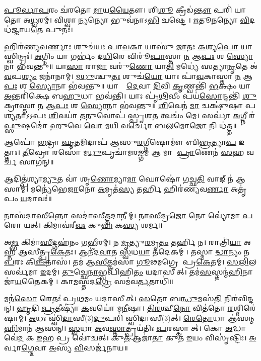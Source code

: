 \ul{𑌪𑍂}\ul{𑌰𑍍𑌵𑌾}\ul{𑌪}𑌰𑌂 𑌚॑𑌰𑌤𑍋 \ul{𑌮𑌾}𑌯\ul{𑌯𑍈}𑌤𑍗।
𑌶𑌿\ul{𑌶𑍂} 𑌕𑍍𑌰𑍀𑌡॑\ul{𑌨𑍍𑌤𑍗} 𑌪𑌰𑌿॑ 𑌯𑌾𑌤𑍋 𑌅\ul{𑌧𑍍𑌵}𑌰𑌮𑍍।
𑌵𑌿𑌶𑍍𑌵𑌾\ul{𑌨𑍍𑌯}𑌨𑍍𑌯𑍋 𑌭𑍁𑌵॑𑌨𑌾𑌽\ul{𑌭𑌿} 𑌚𑌷𑍍𑌟𑍇।
\ul{𑌋}𑌤𑍂\ul{𑌨}𑌨𑍍𑌯𑍋 \ul{𑌵𑌿}𑌦𑌧॑𑌜𑍍𑌜𑌾𑌯\ul{𑌤𑍇} 𑌪𑍁𑌨𑌃॑।

𑌹𑌿𑌰॑𑌣𑍍𑌯𑌵\ul{𑌰𑍍𑌣𑌾𑌃} 𑌶𑍁𑌚॑𑌯𑌃 𑌪𑌾\ul{𑌵}𑌕𑌾 𑌯𑌾𑌸𑍁॑ \ul{𑌜𑌾}𑌤𑌃 \ul{𑌕}𑌶𑍍𑌯\ul{𑌪𑍋} 𑌯𑌾𑌸𑍍𑌵𑌿𑌨𑍍𑌦𑍍𑌰𑌃॑।
\ul{𑌅}𑌗𑍍𑌨𑌿𑌂 𑌯𑌾 𑌗𑌰𑍍𑌭𑌂॑ 𑌦\ul{𑌧𑌿}𑌰𑍇 𑌵𑌿𑌰𑍂॑\ul{𑌪𑌾}𑌸𑍍𑌤𑌾 \ul{𑌨} 𑌆\ul{𑌪𑌃} 𑌶 \ul{𑌸𑍍𑌯𑍋}𑌨𑌾 𑌭॑𑌵𑌨𑍍𑌤𑍁॥ 
𑌯𑌾\ul{𑌸𑌾}\ul{} 𑌰𑌾\ul{𑌜𑌾} 𑌵𑌰𑍁॑\ul{𑌣𑍋} 𑌯𑌾\ul{𑌤𑌿} 𑌮𑌧𑍍𑌯𑍇॑ 𑌸𑌤𑍍𑌯𑌾\ul{𑌨𑍃}𑌤𑍇 𑌅॑\ul{𑌵}𑌪\ul{𑌶𑍍𑌯𑌂} 𑌜𑌨𑌾॑𑌨𑌾𑌮𑍍।
\ul{𑌮}\ul{𑌧𑍁}𑌶𑍍𑌚𑍁\ul{𑌤𑌃} 𑌶𑍁𑌚॑\ul{𑌯𑍋} 𑌯𑌾𑌃 𑌪𑌾॑\ul{𑌵}𑌕𑌾𑌸𑍍𑌤𑌾 \ul{𑌨} 𑌆\ul{𑌪𑌃} 𑌶 \ul{𑌸𑍍𑌯𑍋}𑌨𑌾 𑌭॑𑌵𑌨𑍍𑌤𑍁॥ 
𑌯𑌾𑌸𑌾𑌂᳚ \ul{𑌦𑍇}𑌵𑌾 \ul{𑌦𑌿}𑌵𑌿 \ul{𑌕𑍃}𑌣𑍍𑌵𑌨𑍍𑌤𑌿॑ \ul{𑌭}𑌕𑍍𑌷𑌂 𑌯𑌾 \ul{𑌅}𑌨𑍍𑌤𑌰𑌿॑𑌕𑍍𑌷𑍇 𑌬\ul{𑌹𑍁}𑌧𑌾 𑌭𑌵॑𑌨𑍍𑌤𑌿।
𑌯𑌾𑌃 𑌪𑍃॑\ul{𑌥𑌿}𑌵𑍀𑌂 𑌪𑌯॑\ul{𑌸𑍋}𑌨𑍍𑌦𑌨𑍍𑌤𑌿॑ \ul{𑌶𑍁}𑌕𑍍𑌰𑌾𑌸𑍍𑌤𑌾 \ul{𑌨} 𑌆\ul{𑌪𑌃} 𑌶 \ul{𑌸𑍍𑌯𑍋}𑌨𑌾 𑌭॑𑌵𑌨𑍍𑌤𑍁॥ 
\ul{𑌶𑌿}𑌵𑍇𑌨॑ \ul{𑌮𑌾} 𑌚𑌕𑍍𑌷𑍁॑𑌷𑌾 𑌪𑌶𑍍𑌯𑌤𑌾𑌽𑌽𑌪𑌃 \ul{𑌶𑌿}𑌵𑌯𑌾॑ \ul{𑌤}𑌨𑍁𑌵𑍋𑌪॑ 𑌸𑍍𑌪𑍃𑌶\ul{𑌤} 𑌤𑍍𑌵𑌚𑌂॑ 𑌮𑍇।
𑌸𑌰𑍍𑌵𑌾॑ \ul{𑌅}𑌗𑍍𑌨𑍀 𑌰॑\ul{𑌫𑍍𑌸𑍁}𑌷𑌦𑍋॑ 𑌹𑍁𑌵𑍇 \ul{𑌵𑍋} 𑌮\ul{𑌯𑌿} 𑌵\ul{𑌰𑍍𑌚𑍋} 𑌬\ul{𑌲}𑌮𑍋\ul{𑌜𑍋} 𑌨𑌿 𑌧॑𑌤𑍍𑌤॥

𑌆𑌪𑍋॑ \ul{𑌭}𑌦𑍍𑌰𑌾 \ul{𑌘𑍃}𑌤𑌮𑌿𑌦𑌾𑌪॑ 𑌆𑌸𑍁\ul{𑌰}𑌗𑍍𑌨𑍀𑌷𑍋𑌮𑍗॑ 𑌬𑌿\ul{𑌭𑍍𑌰}𑌤𑍍𑌯𑌾\ul{𑌪} 𑌇𑌤𑍍𑌤𑌾𑌃।
\ul{𑌤𑍀}𑌵𑍍𑌰𑍋 𑌰𑌸𑍋॑ 𑌮\ul{𑌧𑍁}𑌪𑍃𑌚𑌾॑𑌮𑌰\ul{𑌙𑍍𑌗}𑌮 𑌆 𑌮𑌾 \ul{𑌪𑍍𑌰𑌾}𑌣𑍇𑌨॑ \ul{𑌸}𑌹 𑌵𑌰𑍍𑌚॑ 𑌸𑌾𑌗𑌨𑍍॥

𑌆𑌦𑌿𑌤𑍍𑌪॑𑌶𑍍𑌯𑌾\ul{𑌮𑍍𑌯𑍁}𑌤 𑌵𑌾॑ 𑌶𑍃\ul{𑌣𑍋}𑌮𑍍𑌯𑌾\ul{𑌮𑌾} 𑌘𑍋𑌷𑍋॑ 𑌗𑌚𑍍𑌛\ul{𑌤𑌿} 𑌵𑌾𑌙𑍍 𑌨॑ 𑌆𑌸𑌾𑌮𑍍।
𑌮𑌨𑍍𑌯𑍇॑𑌭𑍇\ul{𑌜𑌾}𑌨𑍋 \ul{𑌅}𑌮𑍃𑌤॑\ul{𑌸𑍍𑌯} 𑌤𑌰𑍍\mbox{}\ul{𑌹𑌿} 𑌹𑌿𑌰॑𑌣𑍍𑌯𑌵\ul{𑌰𑍍𑌣𑌾} 𑌅𑌤𑍃॑𑌪𑌂 \ul{𑌯}𑌦𑌾𑌵𑌃॑॥


𑌨𑌾𑌸॑𑌦𑌾\ul{𑌸𑍀}𑌨𑍍𑌨𑍋 𑌸𑌦𑌾॑𑌸𑍀\ul{𑌤𑍍𑌤}𑌦𑌾𑌨𑍀𑌮𑍍।
𑌨𑌾\ul{𑌸𑍀}𑌦𑍍𑌰\ul{𑌜𑍋} 𑌨𑍋 𑌵𑍍𑌯𑍋॑𑌮𑌾 \ul{𑌪}𑌰𑍋 𑌯𑌤𑍍।
𑌕𑌿𑌮𑌾𑌵॑𑌰𑍀\ul{𑌵𑌃} 𑌕𑍁\ul{𑌹} 𑌕\ul{𑌸𑍍𑌯} 𑌶𑌰𑍍𑌮\sn{}॥

𑌅\ul{𑌮𑍍𑌭𑌃} 𑌕𑌿𑌮𑌾॑\ul{𑌸𑍀}𑌦𑍍𑌗𑌹॑𑌨𑌂 𑌗\ul{𑌭𑍀}𑌰𑌮𑍍।
𑌨 \ul{𑌮𑍃}𑌤𑍍𑌯𑍁\ul{𑌰}𑌮𑍃\ul{𑌤𑌂} 𑌤𑌰𑍍\mbox{}\ul{𑌹𑌿} 𑌨।
𑌰𑌾𑌤𑍍𑌰𑌿॑\ul{𑌯𑌾} 𑌅𑌹𑍍𑌨॑ 𑌆𑌸𑍀𑌤𑍍𑌪𑍍𑌰\ul{𑌕𑍇}𑌤𑌃।
𑌆𑌨𑍀॑𑌦\ul{𑌵𑌾}𑌤 \ul{𑌸𑍍𑌵}𑌧\ul{𑌯𑌾} 𑌤𑌦𑍇𑌕𑌮𑍍।
𑌤𑌸𑍍𑌮𑌾\ul{𑌦𑍍𑌧𑌾}𑌨𑍍𑌯𑌂 𑌨 \ul{𑌪}𑌰𑌃 𑌕𑌿\ul{𑌞𑍍𑌚}𑌨𑌾𑌸॑।
𑌤𑌮॑ 𑌆\ul{𑌸𑍀}𑌤𑍍𑌤𑌮॑𑌸𑌾 \ul{𑌗𑍂}𑌢𑌮𑌗𑍍𑌰𑍇 𑌪𑍍𑌰\ul{𑌕𑍇}𑌤𑌮𑍍।
\ul{𑌸}\ul{𑌲𑌿}𑌲 𑌸𑌰𑍍𑌵॑𑌮𑌾 \ul{𑌇}𑌦𑌮𑍍।
\ul{𑌤𑍁}𑌚𑍍𑌛𑍇\ul{𑌨𑌾}𑌭𑍍𑌵𑌪𑌿॑𑌹𑌿\ul{𑌤𑌂} 𑌯𑌦𑌾𑌸𑍀𑌤𑍍।
𑌤𑌮॑\ul{𑌸}𑌸𑍍𑌤𑌨𑍍𑌮॑\ul{𑌹𑌿}𑌨𑌾 𑌜𑌾॑\ul{𑌯}𑌤𑍈𑌕𑌮𑍍।
𑌕𑌾\ul{𑌮}𑌸𑍍𑌤𑌦\ul{𑌗𑍍𑌰𑍇} 𑌸𑌮॑𑌵\ul{𑌰𑍍𑌤}𑌤𑌾𑌧𑌿॑॥

𑌮𑌨॑\ul{𑌸𑍋} 𑌰𑍇𑌤𑌃॑ 𑌪𑍍𑌰\ul{𑌥}𑌮𑌂 𑌯𑌦𑌾𑌸𑍀𑌤𑍍।
\ul{𑌸}𑌤𑍋 𑌬\ul{𑌨𑍍𑌧𑍁}𑌮𑌸॑\ul{𑌤𑌿} 𑌨𑌿𑌰॑𑌵𑌿𑌨𑍍𑌦𑌨𑍍।
\ul{𑌹𑍃}𑌦𑌿 \ul{𑌪𑍍𑌰}𑌤𑍀𑌷𑍍𑌯𑌾॑ \ul{𑌕}𑌵𑌯𑍋॑ 𑌮\ul{𑌨𑍀}𑌷𑌾।
\ul{𑌤𑌿}\ul{𑌰}𑌶𑍍𑌚𑍀\ul{𑌨𑍋} 𑌵𑌿𑌤॑𑌤𑍋 \ul{𑌰}𑌶𑍍𑌮𑌿𑌰𑍇॑𑌷𑌾𑌮𑍍।
\ul{𑌅}𑌧𑌃 𑌸𑍍𑌵𑌿॑\ul{𑌦𑌾}𑌸𑍀(3)\ul{𑌦𑍁}𑌪𑌰𑌿॑ 𑌸𑍍𑌵𑌿𑌦𑌾𑌸𑍀(3)𑌤𑍍।
\ul{𑌰𑍇}\ul{𑌤𑍋}𑌧𑌾 𑌆॑𑌸𑌨𑍍𑌮\ul{𑌹𑌿}𑌮𑌾𑌨॑ 𑌆𑌸𑌨𑍍।
\ul{𑌸𑍍𑌵}𑌧𑌾 \ul{𑌅}𑌵\ul{𑌸𑍍𑌤𑌾}𑌤𑍍𑌪𑍍𑌰𑌯॑𑌤𑌿𑌃 \ul{𑌪}𑌰𑌸𑍍𑌤𑌾𑌤𑍍।
𑌕𑍋 \ul{𑌅}𑌦𑍍𑌧𑌾 𑌵𑍇॑\ul{𑌦} 𑌕 \ul{𑌇}𑌹 𑌪𑍍𑌰 𑌵𑍋॑𑌚𑌤𑍍।
𑌕𑍁\ul{𑌤} 𑌆𑌜𑌾॑\ul{𑌤𑌾} 𑌕𑍁𑌤॑ \ul{𑌇}𑌯𑌂 𑌵𑌿𑌸𑍃॑𑌷𑍍𑌟𑌿𑌃।
\ul{𑌅}𑌰𑍍𑌵𑌾\ul{𑌗𑍍𑌦𑍇}𑌵𑌾 \ul{𑌅}𑌸𑍍𑌯 \ul{𑌵𑌿}𑌸𑌰𑍍𑌜॑𑌨𑌾𑌯॥

